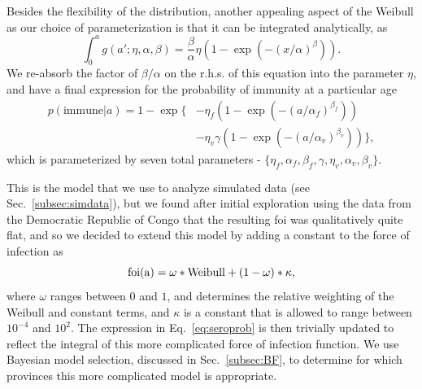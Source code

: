 \documentclass[nofootinbib,aps,pre,twocolumn,superscriptaddress,showkeys,showpacs]{revtex4-1}
\begin{document}
Besides the flexibility of the distribution, another appealing aspect of the Weibull as our choice of parameterization is that it can be integrated analytically, as
\begin{equation}
\int_0^a g(a';\eta,\alpha,\beta) = \frac{\beta}{\alpha} \eta \left( 1 - \exp(-(x/\alpha)^\beta) \right).
\end{equation}
We re-absorb the factor of $\beta/\alpha$ on the r.h.s. of this equation into the parameter $\eta$, and have a final expression for the probability of immunity at a particular age
\begin{align}
\label{eq:seroprob}
p(\mathrm{immune}|a) = 1 - \exp\big\{&-\eta_f\left(1-\exp(-(a/\alpha_f)^{\beta_f})\right)  \nonumber \\ 
&-\eta_v \gamma \left(1-\exp(-(a/\alpha_v)^{\beta_v}) \right)  \big\},
\end{align}
which is parameterized by seven total parameters - $\{\eta_f, \alpha_f, \beta_f, \gamma, \eta_v, \alpha_v, \beta_v\}$.

This is the model that we use to analyze simulated data (see Sec.~\ref{subsec:simdata}), but we found after initial exploration using the data from the Democratic Republic of Congo that the resulting foi was qualitatively quite flat, and so we decided to extend this model by adding a constant to the force of infection as
\begin{equation}
\rm{foi}(a) = \omega * \rm{Weibull} + (1 - \omega)*\kappa,
\end{equation}
where $\omega$ ranges between $0$ and $1$, and determines the relative weighting of the Weibull and constant terms, and $\kappa$ is a constant that is allowed to range between $10^{-4}$ and $10^2$. The expression in Eq.~\ref{eq:seroprob} is then trivially updated to reflect the integral of this more complicated force of infection function. We use Bayesian model selection, discussed in Sec.~\ref{subsec:BF}, to determine for which provinces this more complicated model is appropriate.
\end{document}
